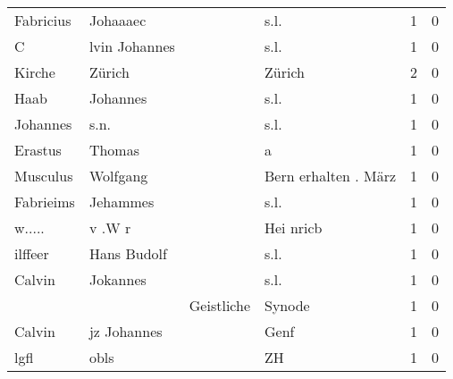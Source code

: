 \begin{tabular}{llllrr}
                Fabricius &                           Johaaaec &             &                                        s.l. &          1 &         0 \\
                        C &                      lvin Johannes &             &                                        s.l. &          1 &         0 \\
                   Kirche &                             Zürich &             &                                      Zürich &          2 &         0 \\
                     Haab &                           Johannes &             &                                        s.l. &          1 &         0 \\
                 Johannes &                               s.n. &             &                                        s.l. &          1 &         0 \\
                  Erastus &                             Thomas &             &                                           a &          1 &         0 \\
                 Musculus &                           Wolfgang &             &                        Bern erhalten . März &          1 &         0 \\
                Fabrieims &                           Jehammes &             &                                        s.l. &          1 &         0 \\
                   w..... &                             v .W r &             &                                   Hei nricb &          1 &         0 \\
                  ilffeer &                        Hans Budolf &             &                                        s.l. &          1 &         0 \\
                   Calvin &                           Jokannes &             &                                        s.l. &          1 &         0 \\
                          &                                    &  Geistliche &                                      Synode &          1 &         0 \\
                   Calvin &                        jz Johannes &             &                                        Genf &          1 &         0 \\
                     lgfl &                               obls &             &                                          ZH &          1 &         0 \\

\end{tabular}
